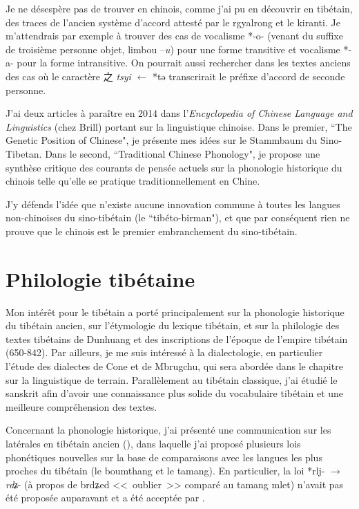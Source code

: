 \documentclass[oldfontcommands,oneside,a4paper,11pt]{memoir}
\newcommand{\ipa}[1]{{\phon #1}} %
\newcommand{\zh}[1]{{\cn #1}}
\begin{document}
Je ne désespère pas de trouver en chinois, comme j'ai pu en découvrir en tibétain, des traces de l'ancien système d'accord attesté par le rgyalrong et le kiranti. Je m'attendrais par exemple à trouver des cas de vocalisme *-o- (venant du suffixe de troisième personne objet, limbou --\textit{u}) pour une forme transitive et vocalisme *-a- pour la forme intransitive. On pourrait aussi rechercher dans les textes anciens des cas où le caractère \zh{之} \textit{tsyi} $\leftarrow$ *tə transcrirait le préfixe d'accord de seconde personne.  


J'ai deux articles à paraître en 2014 dans l'\textit{Encyclopedia of Chinese Language and Linguistics} (chez Brill) portant sur la linguistique chinoise. Dans le premier, ``The Genetic Position of Chinese", je présente mes idées sur le Stammbaum du Sino-Tibetan. Dans le second, ``Traditional Chinese Phonology", je propose une synthèse critique des courants de pensée actuels sur la phonologie historique du chinois telle qu'elle se pratique traditionnellement en Chine.

J'y défends l'idée que n'existe aucune innovation commune à toutes les langues non-chinoises du sino-tibétain (le ``tibéto-birman"), et que par conséquent rien ne prouve que le chinois est le premier embranchement du sino-tibétain.

\section{Philologie tibétaine}
Mon intérêt pour le tibétain a porté principalement sur la phonologie historique du tibétain ancien, sur l’étymologie du lexique tibétain, et sur la philologie des textes tibétains de Dunhuang et des inscriptions de l’époque de l’empire tibétain (650-842). Par ailleurs, je me suis intéressé à la dialectologie, en particulier l'étude des dialectes de Cone et de Mbrugchu, qui sera   abordée dans le chapitre sur la linguistique de terrain. Parallèlement au tibétain classique, j'ai étudié le sanskrit afin d'avoir une connaissance plus solide du vocabulaire tibétain et une meilleure compréhension des textes.

Concernant la phonologie historique, j’ai présenté une communication sur les latérales en tibétain ancien (\citealt{jacques04thimphu}), dans laquelle j’ai proposé plusieurs lois phonétiques nouvelles sur la base de comparaisons avec les langues les plus proches du tibétain (le boumthang et le tamang). En particulier, la loi *rlj- $\rightarrow $ \textit{rdʑ}- (à propos de \ipa{brdʑed} <<~oublier~>> comparé au tamang \ipa{mlet}) n'avait pas été proposée auparavant et a été acceptée par \citet{hill13laterals}.
\end{document}
